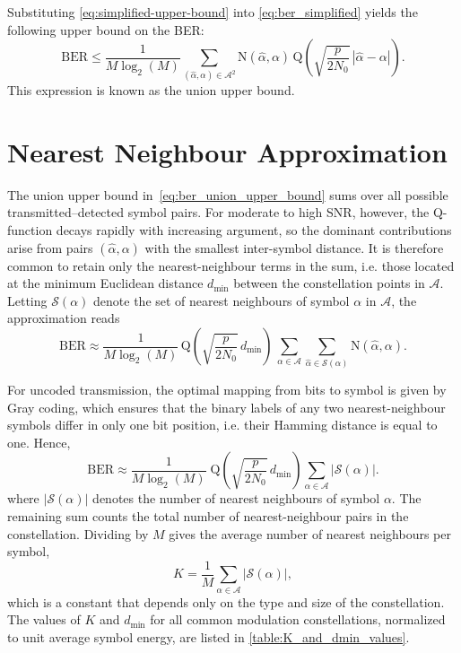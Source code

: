 Substituting \eqref{eq:simplified-upper-bound} into \eqref{eq:ber_simplified} yields the following upper bound on the \ac{BER}:
\begin{equation}
\label{eq:ber_union_upper_bound}
    \mathrm{BER} \leq \frac{1}{M \log_2(M)} \sum_{(\hat{\alpha}, \alpha) \in \mathcal{A}^{2}} \mathrm{N}(\hat{\alpha}, \alpha) \, \mathrm{Q} \left( \sqrt{\frac{p}{2 N_0}} \, |\hat{\alpha} - \alpha| \right).
\end{equation}
This expression is known as the union upper bound.

\section{Nearest Neighbour Approximation}
\label{appendix_section:nn_approximation}

The union upper bound in~\eqref{eq:ber_union_upper_bound} sums over all possible transmitted--detected symbol pairs.
For moderate to high \ac{SNR}, however, the Q-function decays rapidly with increasing argument, so the dominant contributions arise from pairs $(\hat{\alpha}, \alpha)$ with the smallest inter-symbol distance.
It is therefore common to retain only the nearest-neighbour terms in the sum, i.e. those located at the minimum Euclidean distance $d_{\min}$ between the constellation points in $\mathcal{A}$.
Letting $\mathcal{S}(\alpha)$ denote the set of nearest neighbours of symbol $\alpha$ in $\mathcal{A}$, the approximation reads
\begin{equation}
\label{eq:ber_nn_approximation_with_N}
    \mathrm{BER} 
    \approx \frac{1}{M \log_2(M)} \, \mathrm{Q}\!\left(\sqrt{\frac{p}{2N_0}}\,d_{\min}\right) \, \sum_{\alpha \in \mathcal{A}} \sum_{\hat{\alpha} \in \mathcal{S}(\alpha)} \mathrm{N}(\hat{\alpha}, \alpha).
\end{equation}

For uncoded transmission, the optimal mapping from bits to symbol is given by Gray coding, which ensures that the binary labels of any two nearest-neighbour symbols differ in only one bit position, i.e. their Hamming distance is equal to one.
Hence,
\begin{equation}
    \mathrm{BER} \approx \frac{1}{M \log_2(M)}\; \mathrm{Q}\!\left(\sqrt{\frac{p}{2N_0}}\,d_{\min}\right) \sum_{\alpha \in \mathcal{A}} |\mathcal{S}(\alpha)|.
\end{equation}
where $|\mathcal{S}(\alpha)|$ denotes the number of nearest neighbours of symbol $\alpha$.
The remaining sum counts the total number of nearest-neighbour pairs in the constellation.
Dividing by $M$ gives the average number of nearest neighbours per symbol,
\begin{equation}
    K = \frac{1}{M} \sum_{\alpha \in \mathcal{A}} |\mathcal{S}(\alpha)|,
\end{equation}
which is a constant that depends only on the type and size of the constellation.
The values of $K$ and $d_{\min}$ for all common modulation constellations, normalized to unit average symbol energy, are listed in \autoref{table:K_and_dmin_values}.

